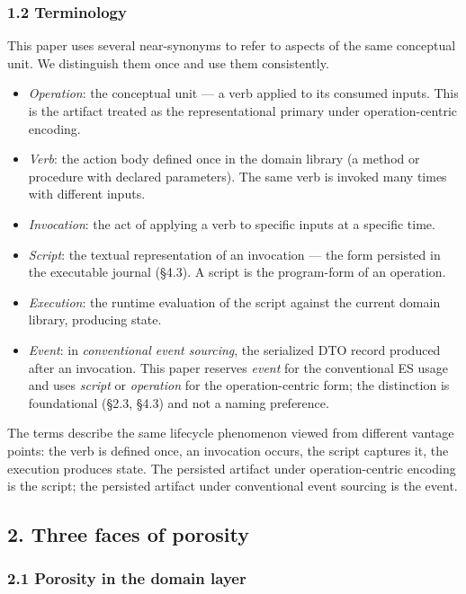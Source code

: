 \documentclass[
]{article}
\providecommand{\tightlist}{%
  \setlength{\itemsep}{0pt}\setlength{\parskip}{0pt}}
\begin{document}
\subsubsection{1.2 Terminology}\label{terminology}

This paper uses several near-synonyms to refer to aspects of the same
conceptual unit. We distinguish them once and use them consistently.

\begin{itemize}
\tightlist
\item
  \emph{Operation}: the conceptual unit --- a verb applied to its
  consumed inputs. This is the artifact treated as the representational
  primary under operation-centric encoding.
\item
  \emph{Verb}: the action body defined once in the domain library (a
  method or procedure with declared parameters). The same verb is
  invoked many times with different inputs.
\item
  \emph{Invocation}: the act of applying a verb to specific inputs at a
  specific time.
\item
  \emph{Script}: the textual representation of an invocation --- the
  form persisted in the executable journal (§4.3). A script is the
  program-form of an operation.
\item
  \emph{Execution}: the runtime evaluation of the script against the
  current domain library, producing state.
\item
  \emph{Event}: in \emph{conventional event sourcing}, the serialized
  DTO record produced after an invocation. This paper reserves
  \emph{event} for the conventional ES usage and uses \emph{script} or
  \emph{operation} for the operation-centric form; the distinction is
  foundational (§2.3, §4.3) and not a naming preference.
\end{itemize}

The terms describe the same lifecycle phenomenon viewed from different
vantage points: the verb is defined once, an invocation occurs, the
script captures it, the execution produces state. The persisted artifact
under operation-centric encoding is the script; the persisted artifact
under conventional event sourcing is the event.

\subsection{2. Three faces of porosity}\label{three-faces-of-porosity}

\subsubsection{2.1 Porosity in the domain
layer}\label{porosity-in-the-domain-layer}
\end{document}

